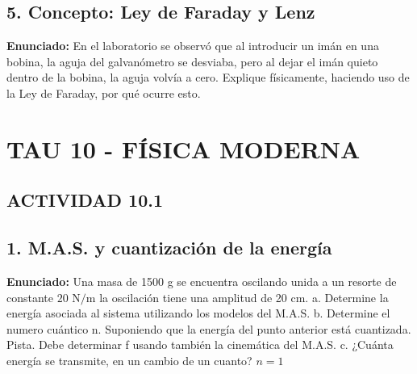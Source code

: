 \documentclass[12pt, letterpaper]{article}
\begin{document}
\subsection*{5. Concepto: Ley de Faraday y Lenz}
\noindent \textbf{Enunciado:} En el laboratorio se observó que al introducir un imán en una bobina, la aguja del galvanómetro se desviaba, pero al dejar el imán quieto dentro de la bobina, la aguja volvía a cero. Explique físicamente, haciendo uso de la Ley de Faraday, por qué ocurre esto.


\newpage
\section*{TAU 10 - FÍSICA MODERNA}

\subsection*{ACTIVIDAD 10.1}

\subsection*{1. M.A.S. y cuantización de la energía}
\noindent \textbf{Enunciado:} Una masa de 1500 g se encuentra oscilando unida a un resorte de constante $20 \text{ N/m}$ la oscilación tiene una amplitud de 20 cm. a. Determine la energía asociada al sistema utilizando los modelos del M.A.S. b. Determine el numero cuántico n. Suponiendo que la energía del punto anterior está cuantizada. Pista. Debe determinar f usando también la cinemática del M.A.S. c. ¿Cuánta energía se transmite, en un cambio de un cuanto? $n=1$ %
\end{document}
